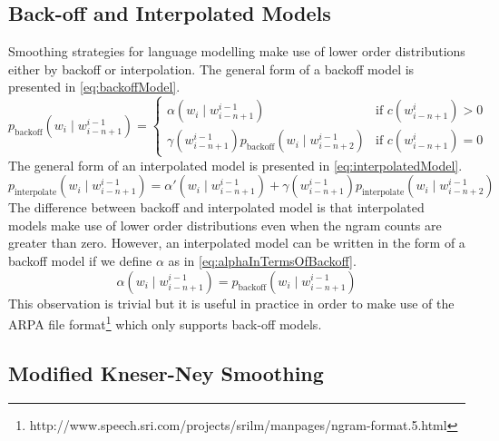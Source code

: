 \subsection{Back-off and Interpolated Models}
\label{sec:backoffAndInterpolatedModels}

Smoothing strategies for language modelling make use of lower order
distributions either by backoff or interpolation. The general form of a backoff
model is presented in \autoref{eq:backoffModel}.
%
\begin{equation}
  p_{\text{backoff}}(w_i \mid w_{i - n + 1}^{i - 1}) =
  \begin{cases}
    \alpha(w_i \mid w_{i - n + 1}^{i - 1}) & \text{if } c(w_{i - n + 1}^i) > 0 \\
    \gamma(w_{i - n + 1}^{i - 1}) p_{\text{backoff}}(w_i \mid w_{i - n + 2}^{i - 1}) & \text{if } c(w_{i - n + 1}^i) = 0
  \end{cases}
  \label{eq:backoffModel}
\end{equation}
%
The general form of an interpolated model is presented in
\autoref{eq:interpolatedModel}.
%
\begin{equation}
  p_{\text{interpolate}}(w_i \mid w_{i - n + 1}^{i - 1}) = \alpha'(w_i \mid w_{i - n + 1}^{i - 1}) + \gamma(w_{i - n + 1}^{i - 1}) p_{\text{interpolate}}(w_i \mid w_{i - n + 2}^{i - 1})
  \label{eq:interpolatedModel}
\end{equation}
%
The difference between backoff and interpolated model is that interpolated
models make use of lower order distributions even when the ngram counts are
greater than zero. However, an interpolated model can be written in the form
of a backoff model if we define $\alpha$ as in
\autoref{eq:alphaInTermsOfBackoff}.
%
\begin{equation}
  \alpha(w_i \mid w_{i - n + 1}^{i - 1}) = p_{\text{backoff}}(w_i \mid w_{i - n + 1}^{i - 1})
  \label{eq:alphaInTermsOfBackoff}
\end{equation}
%
This observation is trivial but it is useful in practice in order to make use of
the ARPA file
format\footnote{http://www.speech.sri.com/projects/srilm/manpages/ngram-format.5.html}
which only supports back-off models.

\subsection{Modified Kneser-Ney Smoothing}
\label{sec:StatisticalMachineTranslationKneserNey}

